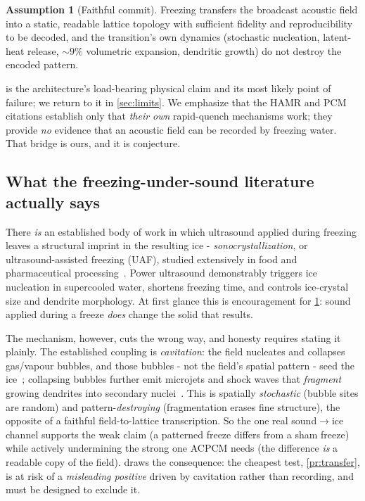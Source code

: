 \documentclass[11pt]{article}
\theoremstyle{definition}
\newtheorem{assumption}{Assumption}
\begin{document}
\begin{assumption}[Faithful commit]\label{as:commit}
Freezing transfers the broadcast acoustic field into a static, readable lattice topology
with sufficient fidelity and reproducibility to be decoded, and the transition's own
dynamics (stochastic nucleation, latent-heat release, ${\sim}9\%$ volumetric expansion,
dendritic growth) do not destroy the encoded pattern.
\end{assumption}

 is the architecture's load-bearing physical claim and its most likely
point of failure; we return to it in \cref{sec:limits}. We emphasize that the HAMR and PCM
citations establish only that \emph{their own} rapid-quench mechanisms work; they provide
\emph{no} evidence that an acoustic field can be recorded by freezing water. That bridge is
ours, and it is conjecture.

\subsection{What the freezing-under-sound literature actually says}
\label{sec:sono}
There \emph{is} an established body of work in which ultrasound applied during freezing
leaves a structural imprint in the resulting ice - \emph{sonocrystallization}, or
ultrasound-assisted freezing (UAF), studied extensively in food and pharmaceutical
processing~\cite{zhang2021uafmech,islam2014radish,delgado2017reviewcontrol}. Power
ultrasound demonstrably triggers ice nucleation in supercooled water, shortens freezing
time, and controls ice-crystal size and dendrite morphology. At first glance this is
encouragement for \cref{as:commit}: sound applied during a freeze \emph{does} change the
solid that results.

The mechanism, however, cuts the wrong way, and honesty requires stating it plainly. The
established coupling is \emph{cavitation}: the field nucleates and collapses gas/vapour
bubbles, and those bubbles - not the field's spatial pattern - seed the
ice~\cite{zhang2021uafmech,saclier2010bubbles}; collapsing bubbles further emit microjets
and shock waves that \emph{fragment} growing dendrites into secondary
nuclei~\cite{zhang2021uafmech}. This is spatially \emph{stochastic} (bubble sites are random)
and pattern-\emph{destroying} (fragmentation erases fine structure), the opposite of a
faithful field-to-lattice transcription. So the one real sound$\rightarrow$ice channel
supports the weak claim (a patterned freeze differs from a sham freeze) while actively
undermining the strong one ACPCM needs (the difference \emph{is} a readable copy of the
field).  draws the consequence: the cheapest test, \cref{pr:transfer}, is at
risk of a \emph{misleading positive} driven by cavitation rather than recording, and must be
designed to exclude it.
\end{document}
